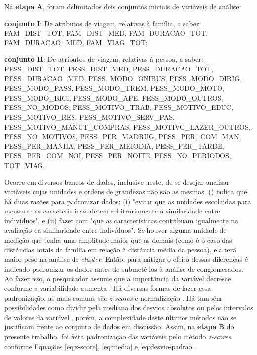 Na \textbf{etapa A}, foram delimitados dois conjuntos iniciais de variáveis de análise:
\begin{compactitem}
\item \textbf{conjunto I}: De atributos de viagem, relativas à família, a saber: FAM_DIST_TOT, FAM_DIST_MED, FAM_DURACAO_TOT, FAM_DURACAO_MED, FAM_VIAG_TOT;
\item \textbf{conjunto II}: De atributos de viagem, relativas à pessoa, a saber: PESS_DIST_TOT, PESS_DIST_MED, PESS_DURACAO_TOT, PESS_DURACAO_MED, PESS_MODO_ONIBUS, PESS_MODO_DIRIG, PESS_MODO_PASS, PESS_MODO_TREM, PESS_MODO_MOTO, PESS_MODO_BICI, PESS_MODO_APE, PESS_MODO_OUTROS, PESS_NO_MODOS, PESS_MOTIVO_TRAB, PESS_MOTIVO_EDUC, PESS_MOTIVO_RES, PESS_MOTIVO_SERV_PAS, PESS_MOTIVO_MANUT_COMPRAS, PESS_MOTIVO_LAZER_OUTROS, PESS_NO_MOTIVOS, PESS_PER_MADRUG, PESS_PER_COM_MAN, PESS_PER_MANHA, PESS_PER_MEIODIA, PESS_PER_TARDE, PESS_PER_COM_NOI, PESS_PER_NOITE, PESS_NO_PERIODOS, TOT_VIAG.
\end{compactitem}

Ocorre em diversos bancos de dados, inclusive neste, de se desejar analisar variáveis cujas unidades e ordens de grandezas não são as mesmas.
 (\citeyear{FARIA2009}) indica que há duas razões para padronizar dados: (i) "evitar que as unidades escolhidas para mensurar as características afetem arbitrariamente a similaridade entre indivíduos", e (ii) fazer com "que as características contribuam igualmente na avaliação da similaridade entre indivíduos". Se houver alguma unidade de medição que tenha uma amplitude maior que as demais (como é o caso das distâncias totais da família em relação à distância média da pessoa), ela terá maior peso na análise de \textit{cluster}. Então, para mitigar o efeito dessas diferenças é indicado padronizar os dados antes de submetê-los à análise de conglomerados. Ao fazer isso, o pesquisador assume que a importância da variável decresce conforme a variabilidade aumenta \cite{EVERITT2011}. Há diversas formas de fazer essa padronização, as mais comuns são \textit{z-scores} e normalização \cite{FAVERO2009}. Há também possibilidades como dividir pela mediana dos desvios absolutos ou pelos intervalos de valores da variável , porém, a complexidade deste últimos métodos não se justificam frente ao conjunto de dados em discussão. Assim, na \textbf{etapa B} do presente trabalho, foi feita padronização das variáveis pelo método \textit{z-scores} conforme Equações \eqref{eq:z-score}, \eqref{eq:media} e \eqref{eq:desvio-padrao}.

